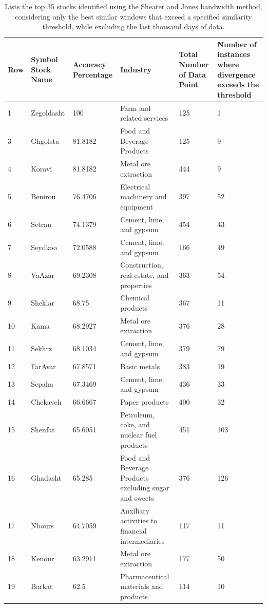 \documentclass[preprint,12pt,authoryear]{elsarticle}
\begin{document}
\begin{longtable}{ p{} p{} p{} p{} p{} p{} } 
\caption{Lists the top 35 stocks identified using the Sheater and Jones bandwidth method, considering only the best similar windows that exceed a specified similarity threshold, while excluding the last thousand days of data.}
\label{table:finding35}
\\ \hline 
\textbf{Row} & \textbf{Symbol Stock Name} & \textbf{Accuracy Percentage}& \textbf{Industry} & \textbf{Total Number of Data Point} & \textbf{Number of instances where divergence exceeds the threshold} \\ \hline
\endhead
1 & Zegoldasht & 100 & Farm and related services & 125 & 1 \\ 
3 & Ghgolsta & 81.8182 & Food and Beverage Products & 125 & 9 \\ 
4 & Koravi & 81.8182 & Metal ore extraction & 444 & 9 \\ 
5 & Benirou & 76.4706 & Electrical machinery and equipment & 397 & 52 \\ 
6 & Setran & 74.1379 & Cement, lime, and gypsum & 454 & 43 \\ 
7 & Seydkoo & 72.0588 & Cement, lime, and gypsum & 166 & 49 \\ 
8 & VaAzar & 69.2308 & Construction, real estate, and properties & 363 & 54 \\ 
9 & Sheklar & 68.75 & Chemical products & 367 & 11 \\ 
10 & Kama & 68.2927 & Metal ore extraction & 376 & 28 \\ 
11 & Sekhrz & 68.1034 & Cement, lime, and gypsum & 379 & 79 \\ 
12 & FarAvar & 67.8571 & Basic metals & 383 & 19 \\ 
13 & Sepaha & 67.3469 & Cement, lime, and gypsum & 436 & 33 \\ 
14 & Chekaveh & 66.6667 & Paper products & 400 & 32 \\ 
15 & Shenfat & 65.6051 & Petroleum, coke, and nuclear fuel products & 451 & 103 \\ 
16 & Ghadasht & 65.285 & Food and Beverage Products excluding sugar and sweets & 376 & 126 \\ 
17 & Nbours & 64.7059 & Auxiliary activities to financial intermediaries & 117 & 11 \\ 
18 & Kenour & 63.2911 & Metal ore extraction & 177 & 50 \\ 
19 & Barkat & 62.5 & Pharmaceutical materials and products & 114 & 10 \\ 

\end{longtable}
\end{document}
